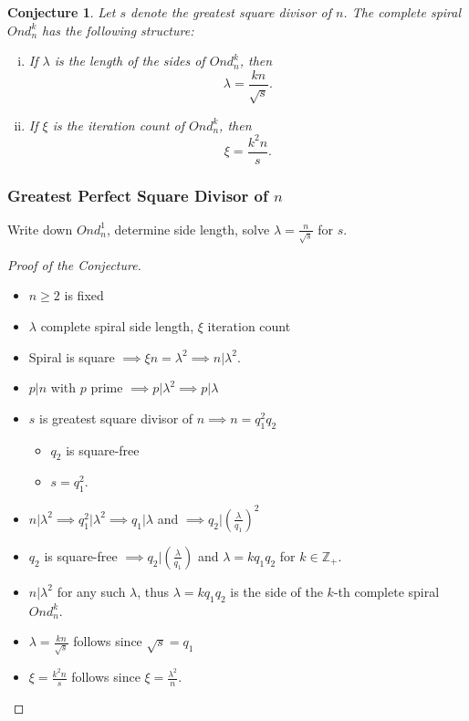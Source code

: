 \documentclass{beamer}
\theoremstyle{mydef}
\newtheorem{conj}{Conjecture}[section]
\begin{document}
\frame
{
  \frametitle{}
  \begin{conj}%
\label{lenthm}
\footnotesize
Let $s$ denote the greatest square divisor of $n$.
The complete spiral $Ond^k_n$ has the following structure:
\begin{enumerate}[(i)]
\item If $\lambda$ is the length of the sides of $Ond^k_n$, then
\begin{equation}
  \lambda = \frac{kn}{\sqrt{s}}.
\label{lambda}
\end{equation}
\item If $\xi$ is the iteration count of $Ond^k_n$, then
\begin{equation}
  \xi = \frac{k^2n}{s}.  
\label{xi}
\end{equation}
\end{enumerate}
\end{conj}
}

\frame
{
  \frametitle{Greatest Perfect Square Divisor of $n$}
  
  Write down $Ond_n^1$, determine side length, solve $\lambda = \frac{n}{\sqrt{s}}$ for $s$.
}

\frame
{

\begin{proof}[Proof of the Conjecture]
\begin{itemize}
  \item $n\ge 2$ is fixed
  \item $\lambda$  complete spiral side length, $\xi$ iteration count
  \item Spiral is square $\implies \xi n = \lambda^2 \implies n \vert \lambda^2$.
  \item $p \vert n$ with $p$ prime $\implies p \vert \lambda^2 \implies p \vert \lambda$
  \item $s$ is greatest square divisor of $n \implies n = q^2_1 q_2$
  \begin{itemize}
  \item $q_2$ is square-free
  \item $s = q_1^2$.
  \end{itemize}
   
  \item  $n \vert \lambda^2 \implies q_1^2\vert\lambda^2 \implies q_1|\lambda$ and $\implies q_2 \vert (\frac{\lambda}{q_1})^2$
  
  \item $q_2$ is square-free $\implies q_2\vert (\frac{\lambda}{q_1})$ and $\lambda = k q_1 q_2$ for $k\in \mathbb{Z}_{+}$.  
  \item $n\vert\lambda^2$ for any such $\lambda$, thus $\lambda = k q_1 q_2$ is the side of the $k$-th complete spiral $Ond^k_n$.

  \item $\lambda = \frac{kn}{\sqrt{s}}$ follows since $\sqrt{s} = q_1$
  \item $\xi = \frac{k^2n}{s}$ follows since $\xi = \frac{\lambda^2}{n}$.  
  \end{itemize}
\end{proof}
}
\end{document}
